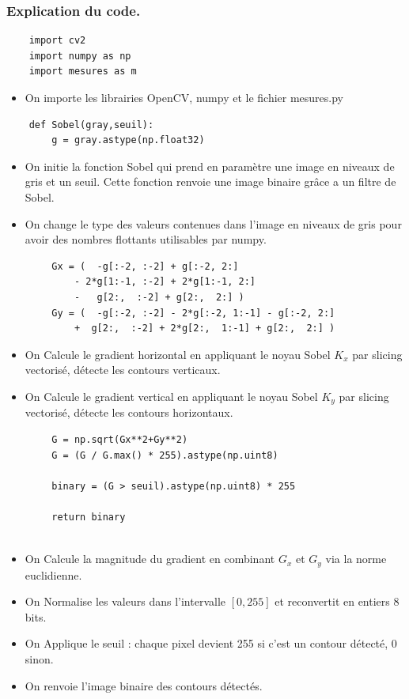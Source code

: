 \documentclass[titlepage]{article}
\begin{document}
	\subsubsection{Explication du code.}
	\begin{lstlisting}
	import cv2
	import numpy as np
	import mesures as m
	\end{lstlisting}
	\begin{itemize}
		\item 
		On importe les librairies OpenCV, numpy et le fichier mesures.py
	\end{itemize}
	\begin{lstlisting}
	def Sobel(gray,seuil):
		g = gray.astype(np.float32)
	\end{lstlisting}
	\begin{itemize}
		\item
		On initie la fonction Sobel qui prend en paramètre une image en niveaux de gris et un seuil. Cette fonction renvoie une image binaire grâce a un filtre de 
		Sobel.
		\item 
		On change le type des valeurs contenues dans l'image en niveaux de gris pour avoir des nombres flottants utilisables par numpy. 
	\end{itemize}
	\begin{lstlisting}
		Gx = (  -g[:-2, :-2] + g[:-2, 2:]
			- 2*g[1:-1, :-2] + 2*g[1:-1, 2:]
			-   g[2:,  :-2] + g[2:,  2:] )
		Gy = (  -g[:-2, :-2] - 2*g[:-2, 1:-1] - g[:-2, 2:]
			+  g[2:,  :-2] + 2*g[2:,  1:-1] + g[2:,  2:] )
	\end{lstlisting}
	\begin{itemize}
		
		\item On Calcule le gradient horizontal en appliquant le noyau Sobel $K_x$ par slicing vectorisé, détecte les contours verticaux.
		
		\item On Calcule le gradient vertical en appliquant le noyau Sobel $K_y$ par slicing vectorisé, détecte les contours horizontaux.
		
	\end{itemize}
	\begin{lstlisting}
		G = np.sqrt(Gx**2+Gy**2)
		G = (G / G.max() * 255).astype(np.uint8)
	
		binary = (G > seuil).astype(np.uint8) * 255
	
		return binary
		
	\end{lstlisting}
	\begin{itemize}
		\item On Calcule la magnitude du gradient en combinant $G_x$ et $G_y$ via la norme euclidienne.
		
		\item On Normalise les valeurs dans l'intervalle $[0, 255]$ et reconvertit en entiers 8 bits.
		
		\item On Applique le seuil : chaque pixel devient 255 si c'est un contour détecté, 0 sinon.
		
		\item On renvoie l'image binaire des contours détectés.
	\end{itemize}
\end{document}
